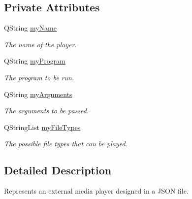 \subsection*{Private Attributes}
\begin{DoxyCompactItemize}
\item 
\hypertarget{class_a_w_e_1_1_j_s_o_n_player_aa99dc8aebfe7df9e8bcb6b57c7b11965}{Q\-String \hyperlink{class_a_w_e_1_1_j_s_o_n_player_aa99dc8aebfe7df9e8bcb6b57c7b11965}{my\-Name}}\label{class_a_w_e_1_1_j_s_o_n_player_aa99dc8aebfe7df9e8bcb6b57c7b11965}

\begin{DoxyCompactList}\small\item\em The name of the player. \end{DoxyCompactList}\item 
\hypertarget{class_a_w_e_1_1_j_s_o_n_player_a7520c773b08630bf0f798cfc97d6bdc4}{Q\-String \hyperlink{class_a_w_e_1_1_j_s_o_n_player_a7520c773b08630bf0f798cfc97d6bdc4}{my\-Program}}\label{class_a_w_e_1_1_j_s_o_n_player_a7520c773b08630bf0f798cfc97d6bdc4}

\begin{DoxyCompactList}\small\item\em The program to be run. \end{DoxyCompactList}\item 
\hypertarget{class_a_w_e_1_1_j_s_o_n_player_a23ae3875dd8e74011e3a013155904798}{Q\-String \hyperlink{class_a_w_e_1_1_j_s_o_n_player_a23ae3875dd8e74011e3a013155904798}{my\-Arguments}}\label{class_a_w_e_1_1_j_s_o_n_player_a23ae3875dd8e74011e3a013155904798}

\begin{DoxyCompactList}\small\item\em The arguments to be passed. \end{DoxyCompactList}\item 
\hypertarget{class_a_w_e_1_1_j_s_o_n_player_a4f02daee62bf7baf7a00abbf7f9153e6}{Q\-String\-List \hyperlink{class_a_w_e_1_1_j_s_o_n_player_a4f02daee62bf7baf7a00abbf7f9153e6}{my\-File\-Types}}\label{class_a_w_e_1_1_j_s_o_n_player_a4f02daee62bf7baf7a00abbf7f9153e6}

\begin{DoxyCompactList}\small\item\em The possible file types that can be played. \end{DoxyCompactList}\end{DoxyCompactItemize}


\subsection{Detailed Description}
Represents an external media player designed in a J\-S\-O\-N file. 

